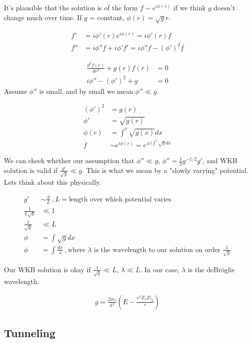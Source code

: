 It's plausible that the solution is of the form $f \sim e^{i \phi(r)}$ if we think $g$ doesn't change much over time. If $g$ = constant, $\phi(r) = \sqrt{g} r$. 

\begin{align}
f' & = i \phi'(r)e^{i \phi(r)} = i \phi'(r)f\\
f'' & =i\phi''f + i \phi'f' = i \phi''f - (\phi')^2f
\end{align}

\begin{align}
\frac{d^2 f(r)}{dr^2} + g(r)f(r) & = 0\\
i\phi'' - (\phi')^2 + g&=0
\end{align}
Assume $\phi''$ is small, and by small we mean $\phi'' \ll g$. 

\begin{align}
(\phi')^2 &= g(r)\\
\phi' & = \sqrt{g(r)}\\
\phi(r) & = \int^r \sqrt{g(x)}dx\\
f & \sim e^{i\phi(r)} = e^{ \pm i\int^r \sqrt{g}dx}
\end{align}

We can check whether our assumption that $\phi'' \ll g$, $\phi'' = \frac{1}{2}g^{-1/2}g'$, and WKB solution is valid if $\frac{g'}{\sqrt{g}} \ll g$. This is what we mean by a "slowly varying" potential. Lets think about this physically. 

\begin{align}
g' &\sim \frac{g}{L}~,L = \text{length over which potential varies}\\
\frac{1}{L\sqrt{g}} &\ll 1\\
\frac{1}{\sqrt{g}} & \ll L\\
\phi &= \int \sqrt{g}dx\\
\phi &= \int \frac{dx}{\lambda}~,\text{where $\lambda$ is the wavelength to our solution on order $\frac{1}{\sqrt{g}}$}
\end{align}

Our WKB solution is okay if $\frac{1}{\sqrt{g}} \ll L$, $\lambda \ll L$. In our case, $\lambda$ is the deBr\"oglie wavelength. 

\begin{align}
g = \frac{2m_r}{\hbar^2} \left( E - \frac{e^2 Z_1 Z)_2}{r}\right)
\end{align}


\subsection{Tunneling}


